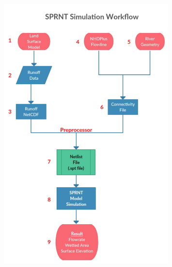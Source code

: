 \documentclass[12pt, letterpaper]{article}
\begin{document}
\begin{figure}[H]
	\centering
	\includegraphics[width = 0.8\textwidth]{figure/Workflow.pdf} %
	\label{fig:process}%
\end{figure}
\newpage
\end{document}
